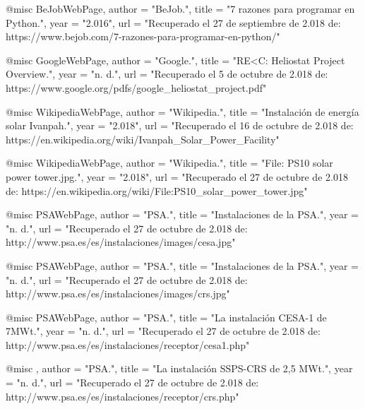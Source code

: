 \documentclass[12pt]{article}
\begin{document}
@misc{ BeJobWebPage,
	author = "BeJob.",
	title = "7 razones para programar en Python.",
	year = "2.016",
	url = "Recuperado el 27 de septiembre de 2.018 de: https://www.bejob.com/7-razones-para-programar-en-python/"
}

@misc{ GoogleWebPage,
	author = "Google.",
	title = "RE<C: Heliostat Project Overview.",
	year = "n. d.",
	url = "Recuperado el 5 de octubre de 2.018 de: https://www.google.org/pdfs/google_heliostat_project.pdf"
}

@misc{ WikipediaWebPage,
	author = "Wikipedia.",
	title = "Instalación de energía solar Ivanpah.",
	year = "2.018",
	url = "Recuperado el 16 de octubre de 2.018 de: https://en.wikipedia.org/wiki/Ivanpah_Solar_Power_Facility"
}

@misc{ WikipediaWebPage,
	author = "Wikipedia.",
	title = "File: PS10 solar power tower.jpg.",
	year = "2.018",
	url = "Recuperado el 27 de octubre de 2.018 de: https://en.wikipedia.org/wiki/File:PS10_solar_power_tower.jpg"
}

@misc{ PSAWebPage,
	author = "PSA.",
	title = "Instalaciones de la PSA.",
	year = "n. d.",
	url = "Recuperado el 27 de octubre de 2.018 de: http://www.psa.es/es/instalaciones/images/cesa.jpg"
}

@misc{ PSAWebPage,
	author = "PSA.",
	title = "Instalaciones de la PSA.",
	year = "n. d.",
	url = "Recuperado el 27 de octubre de 2.018 de: http://www.psa.es/es/instalaciones/images/crs.jpg"
}

@misc{ PSAWebPage,
	author = "PSA.",
	title = "La instalación CESA-1 de 7MWt.",
	year = "n. d.",
	url = "Recuperado el 27 de octubre de 2.018 de: http://www.psa.es/es/instalaciones/receptor/cesa1.php"
}

@misc{ ,
	author = "PSA.",
	title = "La instalación SSPS-CRS de 2,5 MWt.",
	year = "n. d.",
	url = "Recuperado el 27 de octubre de 2.018 de: http://www.psa.es/es/instalaciones/receptor/crs.php"
}



\end{document}
